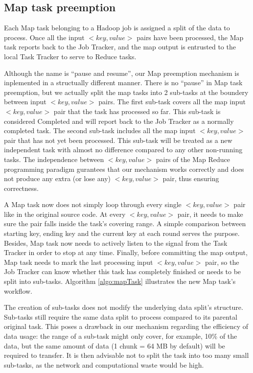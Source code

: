 \documentclass[runningheads,a4paper]{llncs}
\begin{document}
\subsection{Map task preemption}
Each Map task belonging to a Hadoop job is assigned a split of the data to process. Once all the input $<key,value>$ pairs have been processed, the Map task reports back to the Job Tracker, and the map output is entrusted to the local Task Tracker to serve to Reduce tasks.

Although the name is “pause and resume”, our Map preemption mechanism is inplemented in a structually different manner. There is no “pause” in Map task preemption, but we actually split the map tasks into 2 sub-tasks at the boundery between input $<key, value>$ pairs. The first sub-task covers all the map input $<key, value>$ pair that the task has processed so far. This sub-task is considered Completed and will report back to the Job Tracker as a normally completed task. The second sub-task includes all the map input $<key, value>$ pair that has not yet been processed. This sub-task will be treated as a new independent task with almost no difference compared to any other non-running tasks. The independence between $<key, value>$ pairs of the Map Reduce programming paradigm gurantees that our mechanism works correctly and does not produce any extra (or lose any) $<key, value>$ pair, thus ensuring correctness.

A Map task now does not simply loop through every single $<key, value>$ pair like in the original source code. At every $<key, value>$ pair, it needs to make sure the pair falls inside the task’s covering range. A simple comparison between starting key, ending key and the current key at each round serves the purpose. Besides, Map task now needs to actively listen to the signal from the Task Tracker in order to stop at any time. Finally, before committing the map output, Map task needs to mark the last processing input $ <key, value> $ pair, so the Job Tracker can know whether this task has completely finished or needs to be split into sub-tasks. Algorithm \ref{algo:mapTask} illustrates the new Map task’s workflow.

The creation of sub-tasks does not modify the underlying data split’s structure. Sub-tasks still require the same data split to process compared to its parental original task. This poses a drawback in our mechanism regarding the efficiency of data usage: the range of a sub-task might only cover, for example, 10\% of the data, but the same amount of data (1 chunk = 64 MB by default) will be required to transfer. It is then advisable not to split the task into too many small sub-tasks, as the network and computational waste would be high.
\end{document}
